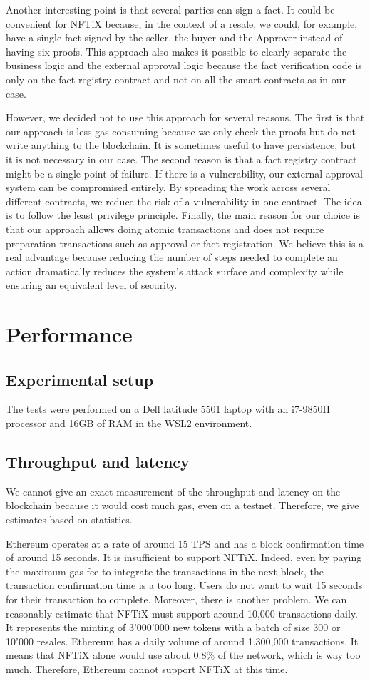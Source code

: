 \documentclass[a4paper,11pt,oneside]{report}
\begin{document}
Another interesting point is that several parties can sign a fact. It could be convenient for NFTiX because, in the context of a resale, we could, for example, have a single fact signed by the seller, the buyer and the Approver instead of having six proofs. This approach also makes it possible to clearly separate the business logic and the external approval logic because the fact verification code is only on the fact registry contract and not on all the smart contracts as in our case.

However, we decided not to use this approach for several reasons. The first is that our approach is less gas-consuming because we only check the proofs but do not write anything to the blockchain. It is sometimes useful to have persistence, but it is not necessary in our case. The second reason is that a fact registry contract might be a single point of failure. If there is a vulnerability, our external approval system can be compromised entirely. By spreading the work across several different contracts, we reduce the risk of a vulnerability in one contract. The idea is to follow the least privilege principle. Finally, the main reason for our choice is that our approach allows doing atomic transactions and does not require preparation transactions such as approval or fact registration. We believe this is a real advantage because reducing the number of steps needed to complete an action dramatically reduces the system's attack surface and complexity while ensuring an equivalent level of security.

\section{Performance}

\subsection{Experimental setup}
The tests were performed on a Dell latitude 5501 laptop with an i7-9850H processor and 16GB of RAM in the WSL2 environment.

\subsection{Throughput and latency}
We cannot give an exact measurement of the throughput and latency on the blockchain because it would cost much gas, even on a testnet. Therefore, we give estimates based on statistics.

Ethereum operates at a rate of around 15 TPS and has a block confirmation time of around 15 seconds. It is insufficient to support NFTiX. Indeed, even by paying the maximum gas fee to integrate the transactions in the next block, the transaction confirmation time is a too long. Users do not want to wait 15 seconds for their transaction to complete. Moreover, there is another problem. We can reasonably estimate that NFTiX must support around 10,000 transactions daily. It represents the minting of 3'000'000 new tokens with a batch of size 300 or 10'000 resales. Ethereum has a daily volume of around 1,300,000 transactions. It means that NFTiX alone would use about 0.8\% of the network, which is way too much. Therefore, Ethereum cannot support NFTiX at this time.
\end{document}
